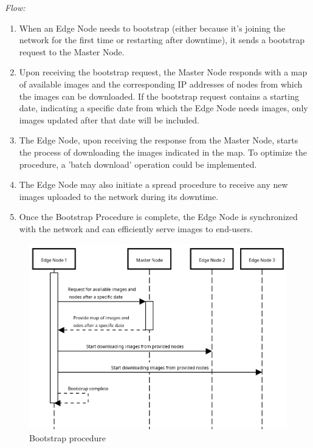 \documentclass{article}
\begin{document}
  \textit{Flow:}
  \begin{enumerate}[label=\arabic*.]
    \item When an Edge Node needs to bootstrap (either because it's joining the network for the first time or
    restarting after downtime), it sends a bootstrap request to the Master Node.

    \item Upon receiving the bootstrap request, the Master Node responds with a map of available images and the
    corresponding IP addresses of nodes from which the images can be downloaded. If the bootstrap request
    contains a starting date, indicating a specific date from which the Edge Node needs
    images, only images updated after that date will be included.

    \item The Edge Node, upon receiving the response from the Master Node, starts the process of
    downloading the images indicated in the map.
    To optimize the procedure, a 'batch download' operation could
    be implemented.

    \item The Edge Node may also initiate a spread procedure to receive any new images uploaded to the
    network during its downtime.

    \item Once the Bootstrap Procedure is complete, the Edge Node is synchronized with the network and can
    efficiently serve images to end-users.
  \end{enumerate}

 \newpage

  \begin{figure}
    \centering
    \includegraphics[width=1.0\textwidth]{imgs/bootstrap_procedure}
    \caption{Bootstrap procedure}
    \label{fig:Edge node bootstrap procedure}
  \end{figure}
\end{document}
